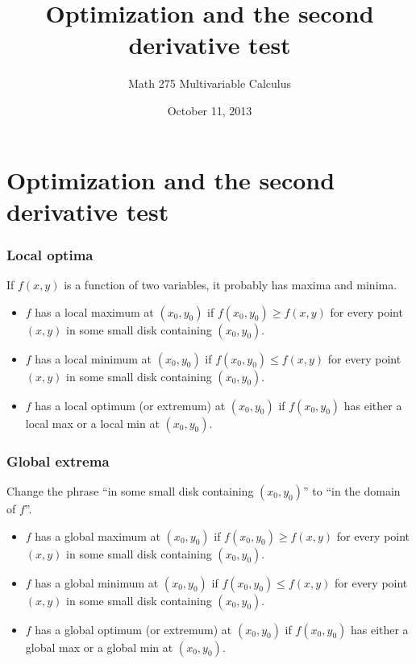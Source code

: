 \documentclass[11pt,ignorenonframetext,aspectratio=169,xcolor={svgnames}]{beamer}
\title{Optimization and the second derivative test}
\author{Math 275 Multivariable Calculus}
\date{October 11, 2013}
\begin{document}
\frame{\titlepage}

\section{Optimization and the second derivative test}

\begin{frame}\frametitle{Local optima}

If $f(x,y)$ is a function of two variables, it probably has maxima and
minima.

\begin{itemize}
\item
  $f$ has a local maximum at $(x_0,y_0)$ if $f(x_0,y_0) \geq f(x,y)$ for
  every point $(x,y)$ in some small disk containing $(x_0,y_0)$.
\item
  $f$ has a local minimum at $(x_0,y_0)$ if $f(x_0,y_0) \leq f(x,y)$ for
  every point $(x,y)$ in some small disk containing $(x_0,y_0)$.
\item
  $f$ has a local optimum (or extremum) at $(x_0,y_0)$ if $f(x_0,y_0)$
  has either a local max or a local min at $(x_0, y_0)$.
\end{itemize}

\end{frame}

\begin{frame}\frametitle{Global extrema}

Change the phrase ``in some small disk containing $(x_0, y_0)$'' to ``in
the domain of $f$''.

\begin{itemize}

\item
  $f$ has a global maximum at $(x_0,y_0)$ if $f(x_0,y_0) \geq f(x,y)$
  for every point $(x,y)$ in some small disk containing $(x_0,y_0)$.
\item
  $f$ has a global minimum at $(x_0,y_0)$ if $f(x_0,y_0) \leq f(x,y)$
  for every point $(x,y)$ in some small disk containing $(x_0,y_0)$.
\item
  $f$ has a global optimum (or extremum) at $(x_0,y_0)$ if $f(x_0,y_0)$
  has either a global max or a global min at $(x_0, y_0)$.
\end{itemize}

\end{frame}
\end{document}
